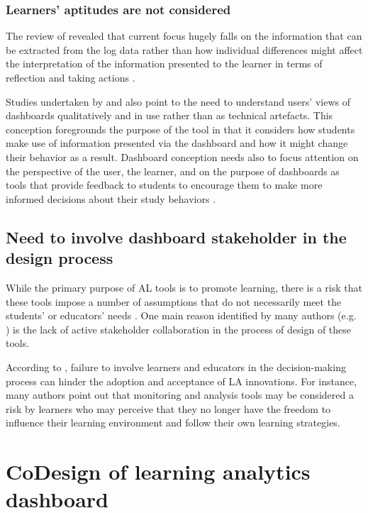 \documentclass[preprint,12pt]{elsarticle}
\begin{document}
\subsubsection{Learners' aptitudes are not considered}
The review of \citet{Schwendimann2017} revealed that current focus hugely falls on the information that can be extracted from the log data rather than how individual differences might affect the interpretation of the information presented to the learner in terms of reflection and taking actions \citep{Gavsevic2015}. 

Studies undertaken by \citet*{bodily2017trends}  and \citet*{viberg2018current}  also point to  the need to understand users' views of dashboards qualitatively and in use rather than  as technical artefacts. This conception foregrounds the purpose of the tool in that it considers how  students make use of information presented via the dashboard and how it might change their  behavior as a result. Dashboard conception needs also to focus attention on the perspective of  the user, the learner, and on the purpose of dashboards as tools that provide feedback to students  to encourage them to make more informed decisions about their study behaviors \citet*{howell2018learning,bennett2019four}.

\subsection{Need to involve dashboard stakeholder in the design process}
While the primary purpose of AL tools is to promote learning, there is a risk that these tools impose a number of assumptions that do not necessarily meet the students' or educators' needs \cite{dawson2015challenging}. One main reason identified by many authors (e.g. \cite{buckingham2019human}) is the lack of active stakeholder collaboration in the process of design of these tools.




According to \citet{beattie2014creepy}, failure to involve learners and educators in the decision-making process can hinder the adoption and acceptance of LA innovations. 
For instance, many authors point out that monitoring and analysis tools may be considered a risk by learners who may perceive that they no longer have the freedom to influence their learning environment and follow their own learning strategies.

\section{CoDesign of learning analytics dashboard}
\end{document}
